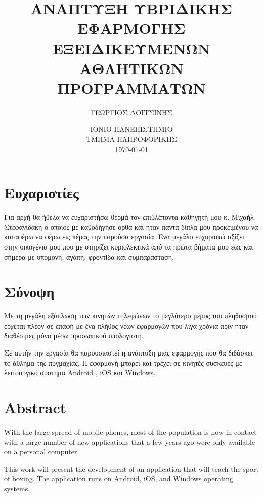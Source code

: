 \documentclass[a4paper,12pt]{article}
\begin{document}
	
	\title{\Large\textbf{{ΑΝΑΠΤΥΞΗ ΥΒΡΙΔΙΚΗΣ ΕΦΑΡΜΟΓΗΣ ΕΞΕΙΔΙΚΕΥΜΕΝΩΝ ΑΘΛΗΤΙΚΩΝ ΠΡΟΓΡΑΜΜΑΤΩΝ}}}
	
	\author{\large{{ΓΕΩΡΓΙΟΣ ΔΟΙΤΣΙΝΗΣ}}}
	
	\date{ΙΟΝΙΟ ΠΑΝΕΠΙΣΤΗΜΙΟ \\ ΤΜΗΜΑ ΠΛΗΡΟΦΟΡΙΚΗΣ \\[5mm] \today}
	
	\maketitle
	
	\newpage
	 \section{Ευχαριστίες}

		Για αρχή θα ήθελα να ευχαριστήσω θερμά τον επιβλέποντα καθηγητή μου κ. Μιχαήλ 
		Στεφανιδάκη ο οποίος με καθοδήγησε ορθά και ήταν πάντα δίπλα μου προκειμένου να
		καταφέρω να φέρω εις πέρας την παρούσα εργασία. 
		Ένα μεγάλο ευχαριστώ αξίζει στην οικογένια μου που με στηρίζει κυριολεκτικά από τα
		πρώτα βήματα μου έως και σήμερα με υπομονή, αγάπη, φροντίδα και συμπαράσταση.
		
 	\newpage		
 	\section{Σύνοψη}

		Με τη μεγάλη εξάπλωση των κινητών τηλεφώνων το μεγλύτερο μέρος του πληθυσμού έρχεται πλέον σε επαφή  
		με ένα πλήθος νέων εφαρμογών που λίγα χρόνια πριν ηταν διαθέσιμες μόνο μέσω προσωπικού υπολογιστή.

		Σε αυτήν την εργασία θα παρουσιαστεί η ανάπτυξη μιας εφαρμογής που θα διδάσκει το άθλημα της πυγμαχίας. Η εφαρμογή μπορεί και τρέχει
		σε κινητές συσκευές με λειτουργικό συστημα Android , iOS και Windows.
	 		
 	\newpage
 	\section{Abstract} 
		
		With the large spread of mobile phones, most of the population is now in contact
		with a large number of new applications that a few years ago were only available on a personal computer.
		
		This work will present the development of an application that will teach the sport of boxing. The application runs
		on Android, iOS, and Windows operating systems.
\end{document}
